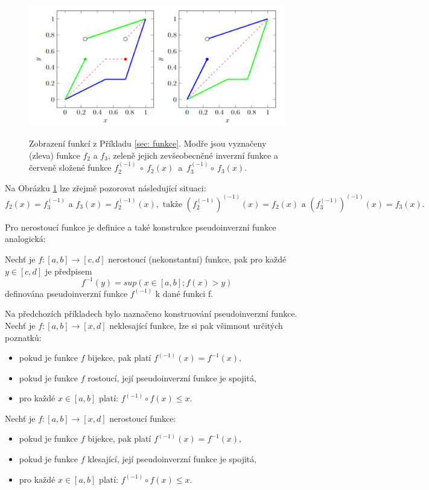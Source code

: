      \begin{figure}[H]
     \caption{Zobrazení funkcí z Příkladu \ref{sec: funkce}. Modře jsou vyznačeny (zleva) funkce $f_2$ a $f_3$, zeleně jejich zevšeobecněné inverzní funkce a červeně složené funkce $f_2^{(-1)}~\circ~f_2(x) $~a~$ f_3^{(-1)}\circ ~f_3(x).$}
                \hspace{-1cm}
                \includegraphics[scale=0.56]{template-fig/zevs_inverz.pdf}
                \centering
     \label{sec: inverz}
            \end{figure}


Na Obrázku \ref{sec: inverz} lze zřejmě pozorovat následující situaci: $$f_2(x)=f_3^{(-1)}\text{ a } f_3(x)=f_2^{(-1)}(x), \text{ takže } (f_2^{(-1)})^{(-1)}(x)=f_2(x) \text{ a }
            (f_3^{(-1)})^{(-1)}(x)=f_3(x).$$ 
            
 Pro nerostouc\'i funkce je definice a tak\'e konstrukce pseudoinverzn\'i funkce analogick\'a: 
\begin{definition}
    \cite{hlinena}
    Nech\v t je $f:[a,b] \rightarrow [c,d]$ nerostoucí (nekonstantní) funkce, pak pro každé $y \in [c,d]$ je předpisem $$f^{-1}(y) = sup(x \in [a,b];f(x)>y)$$
    definována pseudoinverzní funkce $f^{(-1)}$ k dané funkci f.
\end{definition}


\begin{remark} Na předchozích příkladech bylo naznačeno konstruování pseudoinverzní funkce. Nech\v t je $f:[a,b] \rightarrow [x,d]$ neklesající funkce, lze si pak všimnout určitých poznatk\r u:
    \begin{itemize}
        \item pokud je funkce $f$ bijekce, pak platí $f^{(-1)}(x) = f^{-1}(x),$
        \item  pokud je funkce $f$ rostoucí, její pseudoinverzní funkce je spojitá,
        \item  pro každé $x \in [a,b]$ platí: $f^{(-1)}\circ f(x)\leq x.$
    \end{itemize}
    Nech\v t je $f:[a,b] \rightarrow [x,d]$ nerostoucí funkce:
    \begin{itemize}
        \item pokud je funkce $f$ bijekce, pak platí $f^{(-1)}(x) = f^{-1}(x),$
        \item  pokud je funkce $f$ klesající, její pseudoinverzní funkce je spojitá,
        \item  pro každé $x \in [a,b]$ platí: $f^{(-1)}\circ f(x)\leq x.$
    \end{itemize}
\end{remark}

